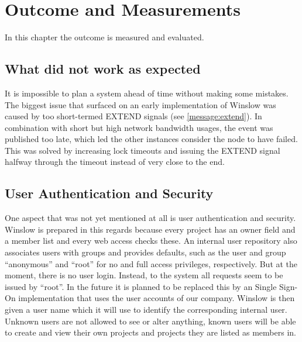 \chapter{Outcome and Measurements}

In this chapter the outcome is measured and evaluated.


\section{What did not work as expected}

It is impossible to plan a system ahead of time without making some mistakes.
The biggest issue that surfaced on an early implementation of Winslow was caused by too short-termed EXTEND signals (see \autoref{message:extend}).
In combination with short but high network bandwidth usages, the event was published too late, which led the other instances consider the node to have failed.
This was solved by increasing lock timeouts and issuing the EXTEND signal halfway through the timeout instead of very close to the end.


\section{User Authentication and Security}
\label{outcome:ssl}

One aspect that was not yet mentioned at all is user authentication and security.
Winslow is prepared in this regards because every project has an owner field and a member list and every web access checks these.
An internal user repository also associates users with groups and provides defaults, such as the user and group \enquote{anonymous} and \enquote{root} for no and full access privileges, respectively.
But at the moment, there is no user login.
Instead, to the system all requests seem to be issued by \enquote{root}.
In the future it is planned to be replaced this by an Single Sign-On implementation that uses the user accounts of our company.
Winslow is then given a user name which it will use to identify the corresponding internal user.
Unknown users are not allowed to see or alter anything, known users will be able to create and view their own projects and projects they are listed as members in.

